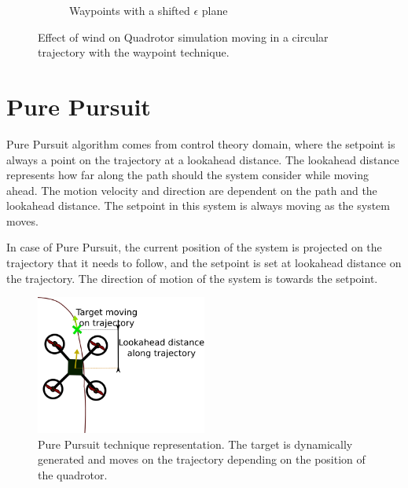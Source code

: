 \documentclass[hidelinks,BTech]{iitmdiss}
\begin{document}
\begin{figure}[H]
\begin{subfigure}[t]{0.49\textwidth}
      \caption{Waypoints with a shifted $\epsilon$ plane}
  \end{subfigure}
  \caption{Effect of wind on Quadrotor simulation moving in a circular trajectory with the waypoint technique.}
\end{figure}


\section{ Pure Pursuit}
Pure Pursuit algorithm comes from control theory domain, where the setpoint is always a point on the trajectory at a lookahead distance. The lookahead distance represents how far along the path should the system consider while moving ahead. The motion velocity and direction are dependent on the path and the lookahead distance. The setpoint in this system is always moving as the system moves.

In case of Pure Pursuit, the current position of the system is projected on the trajectory that it needs to follow, and the setpoint is set at lookahead distance on the trajectory. The direction of motion of the system is towards the setpoint. 

\begin{figure}[H]
  \centering
    \includegraphics[width=0.5\textwidth]{Pure_Pursuit.png}
    \caption{Pure Pursuit technique representation. The target is dynamically generated and moves on the trajectory depending on the position of the quadrotor.}
\end{figure}
\end{document}
